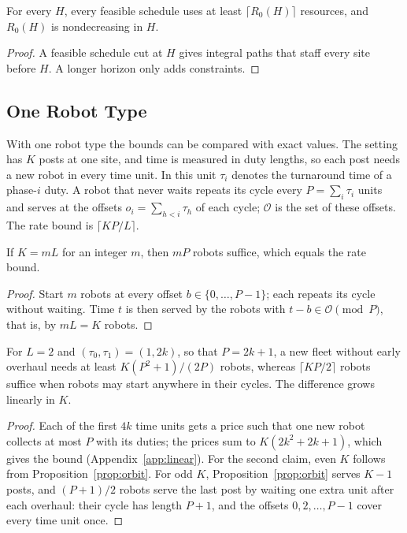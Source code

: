 \begin{proposition}
\label{prop:startup}
For every $H$, every feasible schedule uses at least $\lceil R_0(H) \rceil$ resources, and $R_0(H)$ is nondecreasing in $H$.
\end{proposition}

\begin{proof}
A feasible schedule cut at $H$ gives integral paths that staff every site before $H$.
A longer horizon only adds constraints.
\end{proof}

\subsection{One Robot Type}
\label{sec:bounds:single}

With one robot type the bounds can be compared with exact values.
The setting has $K$ posts at one site, and time is measured in duty lengths, so each post needs a new robot in every time unit.
In this unit $\tau_i$ denotes the turnaround time of a phase-$i$ duty.
A robot that never waits repeats its cycle every $P = \sum_i \tau_i$ units and serves at the offsets $o_i = \sum_{h<i} \tau_h$ of each cycle; $\mathcal{O}$ is the set of these offsets.
The rate bound is $\lceil KP/L \rceil$.

\begin{proposition}
\label{prop:orbit}
If $K = mL$ for an integer $m$, then $mP$ robots suffice, which equals the rate bound.
\end{proposition}

\begin{proof}
Start $m$ robots at every offset $b \in \{0, \dots, P-1\}$; each repeats its cycle without waiting.
Time $t$ is then served by the robots with $t - b \in \mathcal{O} \pmod{P}$, that is, by $mL = K$ robots.
\end{proof}

\begin{proposition}
\label{prop:linear}
For $L = 2$ and $(\tau_0, \tau_1) = (1, 2k)$, so that $P = 2k+1$, a new fleet without early overhaul needs at least $K(P^2+1)/(2P)$ robots, whereas $\lceil KP/2 \rceil$ robots suffice when robots may start anywhere in their cycles.
The difference grows linearly in $K$.
\end{proposition}

\begin{proof}
Each of the first $4k$ time units gets a price such that one new robot collects at most $P$ with its duties; the prices sum to $K(2k^2+2k+1)$, which gives the bound (Appendix~\ref{app:linear}).
For the second claim, even $K$ follows from Proposition~\ref{prop:orbit}.
For odd $K$, Proposition~\ref{prop:orbit} serves $K-1$ posts, and $(P+1)/2$ robots serve the last post by waiting one extra unit after each overhaul: their cycle has length $P+1$, and the offsets $0, 2, \dots, P-1$ cover every time unit once.
\end{proof}

